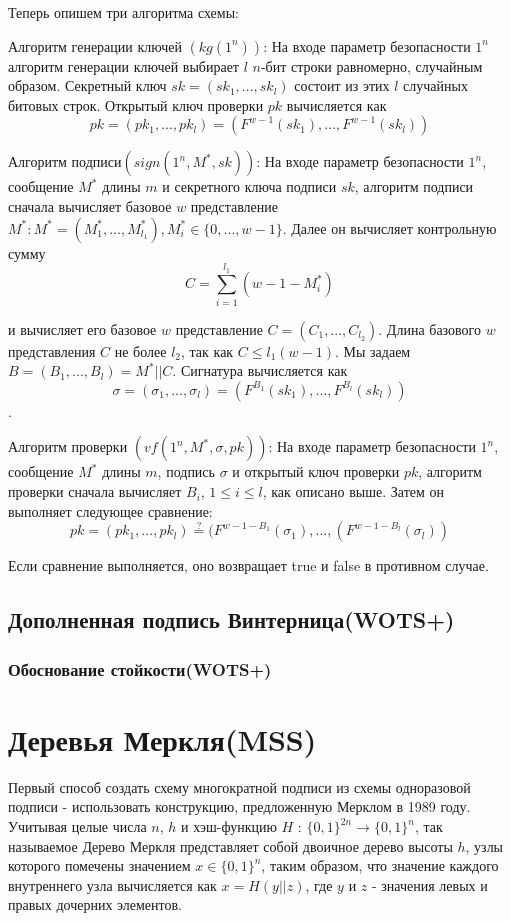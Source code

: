 \documentclass[a4paper, 14pt]{extarticle}
\begin{document}
Теперь опишем три алгоритма схемы:

Алгоритм генерации ключей $(kg(1^{n}))$: На входе параметр безопасности $1^{n}$ алгоритм генерации ключей выбирает $l$ $n$-бит строки равномерно, случайным образом. Секретный ключ $sk = (sk_{1}, ..., sk_{l})$ состоит из этих $l$ случайных битовых строк. Открытый ключ проверки $pk$ вычисляется как
\[ pk = (pk_{1}, ..., pk_{l}) = (F^{w - 1}(sk_{1}), ..., F^{w - 1}(sk_{l})) \]

Алгоритм подписи$(sign(1^{n}, M^{*}, sk))$: На входе параметр безопасности $1^{n}$, сообщение $M^{*}$ длины $m$ и секретного ключа подписи $sk$, алгоритм подписи сначала вычисляет базовое $w$ представление $M^{*}: M^{*} = (M^{*}_{1}, ..., M^{*}_{l_{1}}), M^{*}_{i} \in \{0, ..., w - 1\}$. Далее он вычисляет контрольную сумму
\[ C = \sum^{l_{1}}_{i = 1}(w - 1 - M^{*}_{i}) \]

и вычисляет его базовое $w$ представление $C = (C_{1}, ..., C_{l_2})$. Длина базового $w$ представления $C$ не более $l_{2}$, так как $C \leq l_{1}(w - 1)$. Мы задаем $B = (B_{1}, ..., B_{l}) = M^{*} || C$. Сигнатура вычисляется как
\[ \sigma = (\sigma_{1}, ..., \sigma_{l}) = (F^{B_1}(sk_{1}), ..., F^{B_l}(sk_{l})) \].

Алгоритм проверки $(vf(1^{n}, M^{*}, \sigma, pk))$: На входе параметр безопасности $1^{n}$, сообщение $M^{*}$ длины $m$, подпись $\sigma$ и открытый ключ проверки $pk$, алгоритм проверки сначала вычисляет $B_{i}$, $ 1 \leq i \leq l$, как описано выше. Затем он выполняет следующее сравнение:
\[ pk = (pk_{1}, ..., pk_{l}) \stackrel{?}= (F^{w - 1 - B_{1}}(\sigma_{1}), ..., (F^{w - 1 - B_{l}}(\sigma_{l})) \]

Если сравнение выполняется, оно возвращает true и false в противном случае.
\subsection{Дополненная подпись Винтерница(WOTS+)}
\subsubsection{Обоснование стойкости(WOTS+)}
\newpage

\section{Деревья Меркля(MSS)}
Первый способ создать схему многократной подписи из схемы одноразовой подписи - использовать конструкцию, предложенную Мерклом в 1989 году. Учитывая целые числа $n$, $h$ и хэш-функцию $H$ : $\{0, 1\}^{2n} \rightarrow \{0, 1\}^{n}$, так называемое Дерево Меркля представляет собой двоичное дерево высоты $h$, узлы которого помечены значением $x \in \{0, 1\}^{n}$, таким образом, что значение каждого внутреннего узла вычисляется как $x = H(y||z)$, где $y$ и $z$ - значения левых и правых дочерних элементов.
\end{document}
